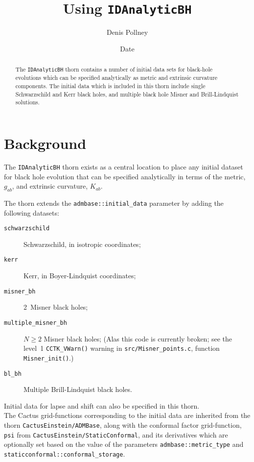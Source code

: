 \documentclass{article}
\begin{document}
\title{Using \texttt{IDAnalyticBH}}
\author{Denis Pollney}
\date{$ $Date$ $}

\maketitle


\begin{abstract}
The \texttt{IDAnalyticBH} thorn contains a number of initial data
sets for black-hole evolutions which can be specified analytically
as metric and extrinsic curvature components. The initial data which
is included in this thorn include single Schwarzschild and Kerr black
holes, and multiple black hole Misner and Brill-Lindquist solutions.
\end{abstract}


\section{Background}

The \texttt{IDAnalyticBH} thorn exists as a central location to place any
initial dataset for black hole evolution that can be specified
analytically in terms of the metric, $g_{ab}$, and extrinsic
curvature, $K_{ab}$.

The thorn extends the \texttt{admbase::initial\_data} parameter by
adding the following datasets:
\begin{description}
  \item[\texttt{schwarzschild}] Schwarzschild, in isotropic
  coordinates;
  \item[\texttt{kerr}] Kerr, in Boyer-Lindquist coordinates;
  \item[\texttt{misner\_bh}] 2~Misner black holes;
  \item[\texttt{multiple\_misner\_bh}] $N \ge 2$ Misner black holes;
	(Alas this code is currently broken; see the level~1
	\verb|CCTK_VWarn()| warning in \verb|src/Misner_points.c|,
	function \verb|Misner_init()|.)

  \item[\texttt{bl\_bh}] Multiple Brill-Lindquist black holes.
\end{description}
Initial data for lapse and shift can also be specified in
this thorn.\\

The Cactus grid-functions corresponding to the initial data are
inherited from the thorn \texttt{CactusEinstein/ADMBase}, along with
the conformal factor grid-function, \texttt{psi} from \texttt{CactusEinstein/StaticConformal}, and its derivatives
which are optionally set based on the value of the parameters
\texttt{admbase::metric\_type} and \texttt{staticconformal::conformal\_storage}.\\
\end{document}
